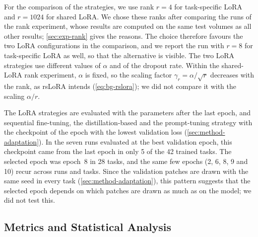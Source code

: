 For the comparison of the strategies, we use rank $r = 4$ for task-specific LoRA and $r = 1024$ for shared LoRA.
We chose these ranks after comparing the runs of the rank experiment, whose results are computed on the same test volumes as all other results; \cref{sec:exp-rank} gives the reasons.
The choice therefore favours the two LoRA configurations in the comparison, and we report the run with $r = 8$ for task-specific LoRA as well, so that the alternative is visible.
The two LoRA strategies use different values of $\alpha$ and of the dropout rate.
Within the shared-LoRA rank experiment, $\alpha$ is fixed, so the scaling factor $\gamma_r = \alpha / \sqrt{r}$ decreases with the rank, as rsLoRA intends (\cref{eq:bg-rslora}); we did not compare it with the scaling $\alpha / r$.

The LoRA strategies are evaluated with the parameters after the last epoch, and sequential fine-tuning, the distillation-based and the prompt-tuning strategy with the checkpoint of the epoch with the lowest validation loss (\cref{sec:method-adaptation}).
In the seven runs evaluated at the best validation epoch, this checkpoint came from the last epoch in only 5 of the 42 trained tasks.
The selected epoch was epoch~8 in 28 tasks, and the same few epochs (2, 6, 8, 9 and 10) recur across runs and tasks.
Since the validation patches are drawn with the same seed in every task (\cref{sec:method-adaptation}), this pattern suggests that the selected epoch depends on which patches are drawn as much as on the model; we did not test this.

\subsection{Metrics and Statistical Analysis}
\label{subsec:exp-metrics}

